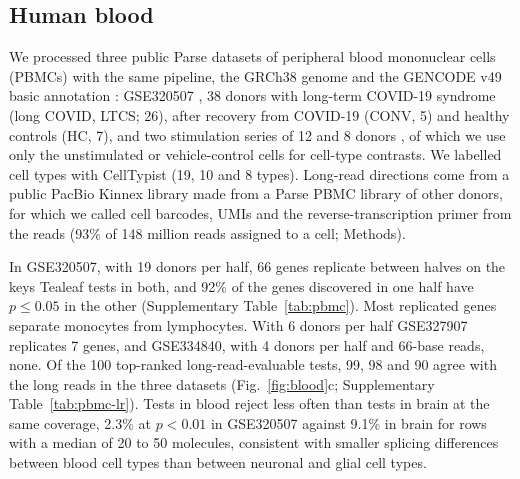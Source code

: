\documentclass[11pt]{article}
\begin{document}
\subsection{Human blood}

We processed three public Parse datasets of peripheral blood mononuclear cells (PBMCs) with the same pipeline, the GRCh38 genome and the GENCODE v49 basic annotation \cite{frankish2023}: GSE320507 \cite{ray2026}, 38 donors with long-term COVID-19 syndrome (long COVID, LTCS; 26), after recovery from COVID-19 (CONV, 5) and healthy controls (HC, 7), and two stimulation series of 12 \cite{wood2026} and 8 donors \cite{benavides2026}, of which we use only the unstimulated or vehicle-control cells for cell-type contrasts. We labelled cell types with CellTypist \cite{dominguezconde2022} (19, 10 and 8 types). Long-read directions come from a public PacBio Kinnex library made from a Parse PBMC library of other donors, for which we called cell barcodes, UMIs and the reverse-transcription primer from the reads (93\% of 148 million reads assigned to a cell; Methods).

In GSE320507, with 19 donors per half, 66 genes replicate between halves on the keys Tealeaf tests in both, and 92\% of the genes discovered in one half have $p\le0.05$ in the other (Supplementary Table~\ref{tab:pbmc}). Most replicated genes separate monocytes from lymphocytes. With 6 donors per half GSE327907 replicates 7 genes, and GSE334840, with 4 donors per half and 66-base reads, none. Of the 100 top-ranked long-read-evaluable tests, 99, 98 and 90 agree with the long reads in the three datasets (Fig.~\ref{fig:blood}c; Supplementary Table~\ref{tab:pbmc-lr}). Tests in blood reject less often than tests in brain at the same coverage, 2.3\% at $p<0.01$ in GSE320507 against 9.1\% in brain for rows with a median of 20 to 50 molecules, consistent with smaller splicing differences between blood cell types than between neuronal and glial cell types.
\end{document}
